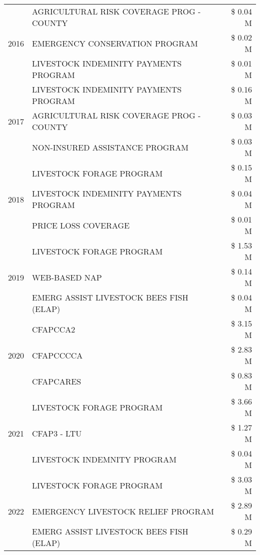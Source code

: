 \begin{tabular}{llr}
\cline{1-3}
\multirow[t]{3}{*}{2016} & AGRICULTURAL RISK COVERAGE PROG - COUNTY & \$ 0.04 M \\
 & EMERGENCY CONSERVATION PROGRAM & \$ 0.02 M \\
 & LIVESTOCK INDEMINITY PAYMENTS PROGRAM & \$ 0.01 M \\
\cline{1-3}
\multirow[t]{3}{*}{2017} & LIVESTOCK INDEMINITY PAYMENTS PROGRAM & \$ 0.16 M \\
 & AGRICULTURAL RISK COVERAGE PROG - COUNTY & \$ 0.03 M \\
 & NON-INSURED ASSISTANCE PROGRAM & \$ 0.03 M \\
\cline{1-3}
\multirow[t]{3}{*}{2018} & LIVESTOCK FORAGE PROGRAM & \$ 0.15 M \\
 & LIVESTOCK INDEMINITY PAYMENTS PROGRAM & \$ 0.04 M \\
 & PRICE LOSS COVERAGE & \$ 0.01 M \\
\cline{1-3}
\multirow[t]{3}{*}{2019} & LIVESTOCK FORAGE PROGRAM & \$ 1.53 M \\
 & WEB-BASED NAP & \$ 0.14 M \\
 & EMERG ASSIST LIVESTOCK BEES FISH (ELAP) & \$ 0.04 M \\
\cline{1-3}
\multirow[t]{3}{*}{2020} & CFAPCCA2 & \$ 3.15 M \\
 & CFAPCCCCA & \$ 2.83 M \\
 & CFAPCARES & \$ 0.83 M \\
\cline{1-3}
\multirow[t]{3}{*}{2021} & LIVESTOCK FORAGE PROGRAM & \$ 3.66 M \\
 & CFAP3 - LTU & \$ 1.27 M \\
 & LIVESTOCK INDEMNITY PROGRAM & \$ 0.04 M \\
\cline{1-3}
\multirow[t]{3}{*}{2022} & LIVESTOCK FORAGE PROGRAM & \$ 3.03 M \\
 & EMERGENCY LIVESTOCK RELIEF PROGRAM & \$ 2.89 M \\
 & EMERG ASSIST LIVESTOCK BEES FISH (ELAP) & \$ 0.29 M \\
\cline{1-3}
\bottomrule
\end{tabular}
